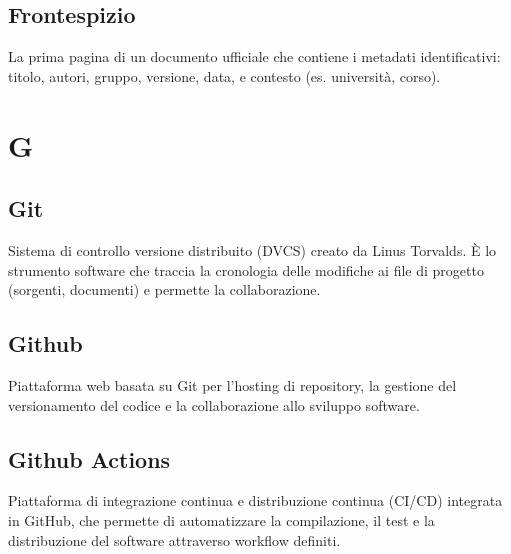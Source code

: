 \documentclass[a4paper, 11pt, oneside]{scrartcl} %
\begin{document}
\subsection*{Frontespizio}


La prima pagina di un documento ufficiale che contiene i metadati identificativi: titolo, autori, gruppo, versione, data, e contesto (es. università, corso).

\vspace{0.5cm}


\section*{G}


\subsection*{Git}


Sistema di controllo versione distribuito (DVCS) creato da Linus Torvalds.
È lo strumento software che traccia la cronologia delle modifiche ai file di progetto (sorgenti, documenti) e permette la collaborazione.

\vspace{0.5cm}

\subsection*{Github}


Piattaforma web basata su Git per l'hosting di repository, la gestione del versionamento del codice e la collaborazione allo sviluppo software.

\vspace{0.5cm}

\subsection*{Github Actions}
Piattaforma di integrazione continua e distribuzione continua (CI/CD) integrata in GitHub, che permette di automatizzare la compilazione, il test e la distribuzione del software attraverso workflow definiti.
\vspace{0.5cm}
\end{document}
